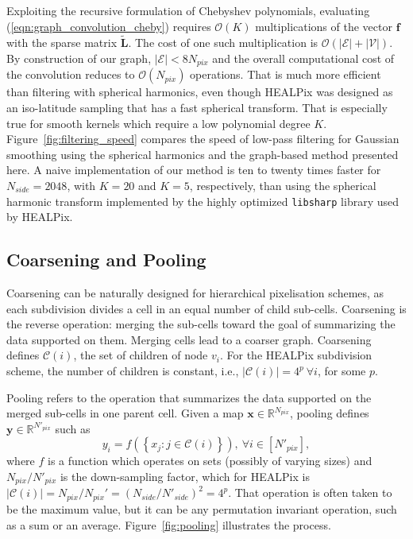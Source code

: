 \documentclass[final,twocolumn,3p,times,sort&compress]{elsarticle}
\newcommand{\figref}[1]{Figure~\ref{fig:#1}}
\newcommand{\eqnref}[1]{(\ref{eqn:#1})}
\renewcommand{\b}[1]{{\bm{#1}}}   %
\newcommand{\1}{\b{1}}              %
\newcommand{\0}{\b{0}}              %
\newcommand{\V}{\mathcal{V}}
\newcommand{\E}{\mathcal{E}}
\newcommand{\C}{\mathcal{C}}
\renewcommand{\L}{\b{L}}
\newcommand{\tL}{\tilde{\L}}
\newcommand{\x}{\b{x}}
\newcommand{\y}{\b{y}}
\newcommand{\f}{\b{f}}
\newcommand{\R}{\mathbb{R}}
\newcommand{\bO}{\mathcal{O}}
\newcommand{\pkg}[1]{\texttt{#1}}
\begin{document}
Exploiting the recursive formulation of Chebyshev polynomials, evaluating \eqnref{graph_convolution_cheby} requires $\bO(K)$ multiplications of the vector $\f$ with the sparse matrix $\tL$.
The cost of one such multiplication is $\bO(|\E| + |\V|)$.
By construction of our graph, $|\E| < 8 N_{pix}$ and the overall computational cost of the convolution reduces to $\bO(N_{pix})$ operations.
That is much more efficient than filtering with spherical harmonics, even though HEALPix was designed as an iso-latitude sampling that has a fast spherical transform.
That is especially true for smooth kernels which require a low polynomial degree $K$.
\figref{filtering_speed} compares the speed of low-pass filtering for Gaussian smoothing using the spherical harmonics and the graph-based method presented here.
A naive implementation of our method is ten to twenty times faster for $N_{side} = 2048$, with $K=20$ and $K=5$, respectively, than using the spherical harmonic transform implemented by the highly optimized \pkg{libsharp} \citep{reinecke2013libsharp} library used by HEALPix.

\subsection{Coarsening and Pooling}

Coarsening can be naturally designed for hierarchical pixelisation schemes, as each subdivision divides a cell in an equal number of child sub-cells.
Coarsening is the reverse operation: merging the sub-cells toward the goal of summarizing the data supported on them.
Merging cells lead to a coarser graph.
Coarsening defines $\C(i)$, the set of children of node $v_i$.
For the HEALPix subdivision scheme, the number of children is constant, i.e., $| \C(i) | = 4^p \ \forall i$, for some $p$.

Pooling refers to the operation that summarizes the data supported on the merged sub-cells in one parent cell.
Given a map $\x \in \R^{N_{pix}}$, pooling defines $\y \in \R^{N'_{pix}}$ such as
\begin{equation} \label{eqn:pooling}
	y_i = f \left( \left\{ x_j : j \in \C(i) \right\} \right), \ \forall i \in [N'_{pix}],
\end{equation}
where $f$ is a function which operates on sets (possibly of varying sizes) and $N_{pix} / {N'_{pix}}$ is the down-sampling factor, which for HEALPix is $| \C(i) | = N_{pix} / {N_{pix}}' = (N_{side} / N'_{side})^2 = 4^p$.
That operation is often taken to be the maximum value, but it can be any permutation invariant operation, such as a sum or an average.
\figref{pooling} illustrates the process.
\end{document}
